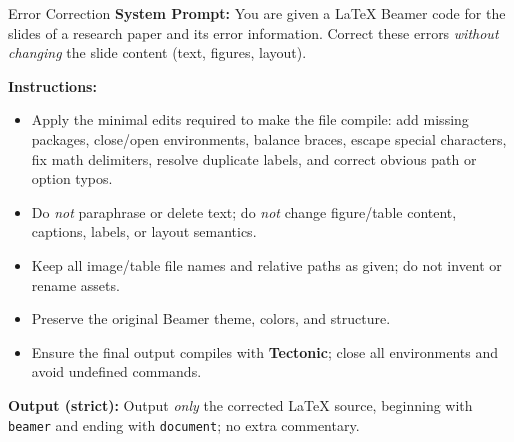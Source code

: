 \begin{promptbox}{Error Correction}
\textbf{System Prompt:} You are given a LaTeX Beamer code for the slides of a research paper and its error information. Correct these errors \emph{without changing} the slide content (text, figures, layout).

\medskip
\textbf{Instructions:}
\begin{itemize}
  \item Apply the minimal edits required to make the file compile: add missing packages, close/open environments, balance braces, escape special characters, fix math delimiters, resolve duplicate labels, and correct obvious path or option typos.
  \item Do \emph{not} paraphrase or delete text; do \emph{not} change figure/table content, captions, labels, or layout semantics.
  \item Keep all image/table file names and relative paths as given; do not invent or rename assets.
  \item Preserve the original Beamer theme, colors, and structure.
  \item Ensure the final output compiles with \textbf{Tectonic}; close all environments and avoid undefined commands.
\end{itemize}

\medskip
\textbf{Output (strict):} Output \emph{only} the corrected LaTeX source, beginning with \texttt{beamer} and ending with \texttt{document}; no extra commentary.
\end{promptbox}

